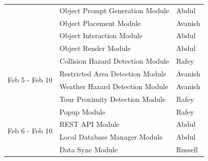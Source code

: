 \documentclass[12pt, titlepage]{article}
\begin{document}
\begin{table}[H]
\begin{tabular}{lll}
\multicolumn{1}{|l|}{}                                 & \multicolumn{1}{l|}{Object Prompt Generation Module}          & \multicolumn{1}{l|}{Abdul}                    \\ \cline{2-3} 
\multicolumn{1}{|l|}{}                                 & \multicolumn{1}{l|}{Object Placement Module}                  & \multicolumn{1}{l|}{Avanish}                  \\ \cline{2-3} 
\multicolumn{1}{|l|}{}                                 & \multicolumn{1}{l|}{Object Interaction Module}                & \multicolumn{1}{l|}{Abdul}                    \\ \cline{2-3} 
\multicolumn{1}{|l|}{}                                 & \multicolumn{1}{l|}{Object Render Module}                     & \multicolumn{1}{l|}{Abdul}                    \\ \hline
\multicolumn{1}{|l|}{\multirow{4}{*}{Feb 5 - Feb 10}}  & \multicolumn{1}{l|}{Collision Hazard Detection Module}         & \multicolumn{1}{l|}{Rafey}                    \\ \cline{2-3} 
\multicolumn{1}{|l|}{}                                 & \multicolumn{1}{l|}{Restricted Area Detection Module}          & \multicolumn{1}{l|}{Avanish}                  \\ \cline{2-3} 
\multicolumn{1}{|l|}{}                                 & \multicolumn{1}{l|}{Weather Hazard Detection Module}           & \multicolumn{1}{l|}{Avanish}                  \\ \cline{2-3} 
\multicolumn{1}{|l|}{}                                 & \multicolumn{1}{l|}{Tour Proximity Detection Module}           & \multicolumn{1}{l|}{Rafey}                    \\ \hline
\multicolumn{1}{|l|}{\multirow{4}{*}{Feb 6 - Feb 10}}  & \multicolumn{1}{l|}{Popup Module}                     & \multicolumn{1}{l|}{Rafey}                    \\ \cline{2-3} 
\multicolumn{1}{|l|}{}                                 & \multicolumn{1}{l|}{REST API Module}                          & \multicolumn{1}{l|}{Abdul}                    \\ \cline{2-3} 
\multicolumn{1}{|l|}{}                                 & \multicolumn{1}{l|}{Local Database Manager Module}             & \multicolumn{1}{l|}{Abdul}                    \\ \cline{2-3} 
\multicolumn{1}{|l|}{}                                 & \multicolumn{1}{l|}{Data Sync Module}                         & \multicolumn{1}{l|}{Russell}                  \\ \hline

\end{tabular}
\end{table}
\end{document}
